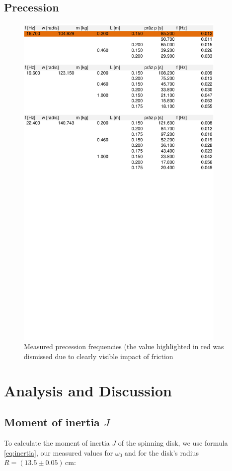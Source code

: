 \documentclass{scrreprt}
\newcommand{\unit}[1]{\ensuremath{\, \mathrm{#1}}}
\begin{document}
\subsection{Precession}
\begin{figure}[H]
	\centering
  \includegraphics[width=0.9\textwidth]{diag/precession.pdf}
	\caption{Measured precession frequencies (the value highlighted in red was dismissed due to clearly visible impact of friction}
	\label{fig:precession}
\end{figure}

\section{Analysis and Discussion}

\subsection{Moment of inertia $J$}
To calculate the moment of inertia $J$ of the spinning disk, we use formula \ref{eq:inertia}, our measured values for $\omega_0$ and for the disk's radius $R = (13.5 \pm 0.05) \unit{cm}$:
\end{document}
